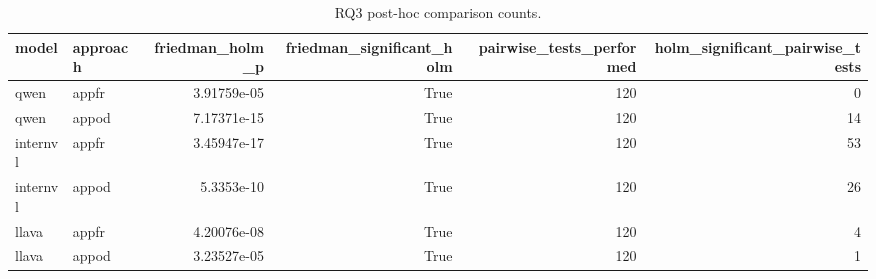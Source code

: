 \begin{table}[tbp]
\caption{RQ3 post-hoc comparison counts.}
\label{tab:rq3-pairwise-summary}
\begin{tabular}{llrrrr}
\toprule
model & approach & friedman\_holm\_p & friedman\_significant\_holm & pairwise\_tests\_performed & holm\_significant\_pairwise\_tests \\
\midrule
qwen & appfr & 3.91759e-05 & True & 120 & 0 \\
qwen & appod & 7.17371e-15 & True & 120 & 14 \\
internvl & appfr & 3.45947e-17 & True & 120 & 53 \\
internvl & appod & 5.3353e-10 & True & 120 & 26 \\
llava & appfr & 4.20076e-08 & True & 120 & 4 \\
llava & appod & 3.23527e-05 & True & 120 & 1 \\
\bottomrule
\end{tabular}
\end{table}
